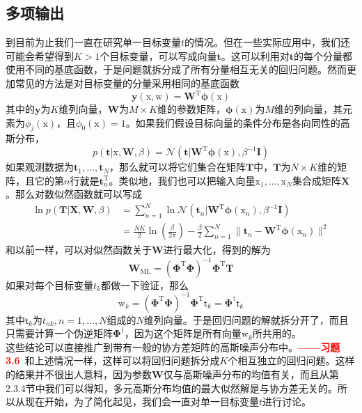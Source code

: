 \documentclass[b5paper]{book}
\numberwithin{equation}{chapter}
\newcommand {\bx} {\boldsymbol{\mathrm{x}}}
\newcommand {\bw} {\boldsymbol{\mathrm{w}}}
\newcommand {\sft} {\boldsymbol{\mathsf{t}}}
\newcommand {\rmT} {\mathrm{T}}
\newcommand {\bfPhi} {\boldsymbol{\Phi}}
\newcommand {\bfphi} {\boldsymbol{\phi}}
\newcommand {\calN} {\mathcal{N}}
\begin{document}
	\subsection{多项输出}
	\textnormal{
	到目前为止我们一直在研究单一目标变量$t$的情况。但在一些实际应用中，我们还可能会希望得到$K > 1$个目标变量，可以写成向量$\mathbf{t}$。这可以利用对$\mathbf{t}$的每个分量都使用不同的基底函数，于是问题就拆分成了所有分量相互无关的回归问题。然而更加常见的方法是对目标变量的分量采用相同的基底函数
	\begin{equation}
		\mathbf{y}(\bx, \bw) = \mathbf{W}^{\rmT} \bfphi(\bx) 
	\end{equation}
	其中的$\mathbf{y}$为$K$维列向量，$\mathbf{W}$为$M \times K$维的参数矩阵，$\bfphi(\bx)$为$M$维的列向量，其元素为$\phi_j(\bx)$，且$\phi_0(\bx)=1$。如果我们假设目标向量的条件分布是各向同性的高斯分布，
	\begin{equation}
		p(\mathbf{t}|\bx,\mathbf{W},\beta) = \calN (\mathbf{t}|\mathbf{W}^{\rmT}\bfphi(\bx),\beta^{-1}\mathbf{I})
	\end{equation}
	如果观测数据为$\mathbf{t}_1,...,\mathbf{t}_N$，那么就可以将它们集合在矩阵$\mathbf{T}$中，$\mathbf{T}$为$N \times K$维的矩阵，且它的第$n$行就是$\mathbf{t}_n^{\rmT}$。类似地，我们也可以把输入向量$\bx_1, ..., \bx_N$集合成矩阵$\mathbf{X}$。那么对数似然函数就可以写成
	\begin{equation}
	\begin{split}
		\ln p(\mathbf{T}|\mathbf{X,W},\beta) &= \sum_{n=1}^N \ln \calN(\mathbf{t}_n|\mathbf{W}^{\rmT}\bfphi(\bx_n),\beta^{-1}\mathbf{I})\\
		&= \frac{NK}{2}\ln \left(\frac{\beta}{2\pi}\right) -\frac{\beta}{2}\sum_{n=1}^N \|\mathbf{t}_n - \mathbf{W}^{\rmT} \bfphi(\bx_n)\|^2
	\end{split}
	\end{equation}
	和以前一样，可以对似然函数关于$\mathbf{W}$进行最大化，得到的解为
	\begin{equation}
		\mathbf{W}_{\mathrm{ML}} = (\bfPhi^{\rmT} \bfPhi)^{-1} \bfPhi^{\rmT} \mathbf{T}
	\end{equation}
	如果对每个目标变量$t_k$都做一下验证，那么
	\begin{equation}
		\bw_k = (\bfPhi^{\rmT} \bfPhi)^{-1} \bfPhi^{\rmT} \sft_k = \bfPhi^{\dagger}\sft_k
	\end{equation}
	其中$\sft_k$为$t_{nk}, n=1,...,N$组成的$N$维列向量。于是回归问题的解就拆分开了，而且只需要计算一个伪逆矩阵$\bfPhi^{\dagger}$，因为这个矩阵是所有向量$\bw_k$所共用的。\\
	\indent 这些结论可以直接推广到带有一般的协方差矩阵的高斯噪声分布中。\textcolor{red}{\textbf{——习题 3.6}}\ 和上述情况一样，这样可以将回归问题拆分成$K$个相互独立的回归问题。这样的结果并不很出人意料，因为参数$\mathbf{W}$仅与高斯噪声分布的均值有关，而且从第2.3.4节中我们可以得知，多元高斯分布均值的最大似然解是与协方差无关的。所以从现在开始，为了简化起见，我们会一直对单一目标变量$t$进行讨论。
	}
\end{document}
